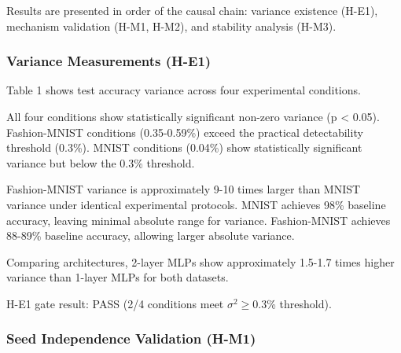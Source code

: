 
Results are presented in order of the causal chain: variance existence (H-E1), mechanism validation (H-M1, H-M2), and stability analysis (H-M3).

\subsubsection{Variance Measurements (H-E1)}

Table 1 shows test accuracy variance across four experimental conditions.

\begin{table}[htbp]
\centering
{}
\end{table}

All four conditions show statistically significant non-zero variance (p < 0.05). Fashion-MNIST conditions (0.35-0.59\%) exceed the practical detectability threshold (0.3\%). MNIST conditions (0.04\%) show statistically significant variance but below the 0.3\% threshold.

Fashion-MNIST variance is approximately 9-10 times larger than MNIST variance under identical experimental protocols. MNIST achieves 98\% baseline accuracy, leaving minimal absolute range for variance. Fashion-MNIST achieves 88-89\% baseline accuracy, allowing larger absolute variance.

Comparing architectures, 2-layer MLPs show approximately 1.5-1.7 times higher variance than 1-layer MLPs for both datasets.

H-E1 gate result: PASS (2/4 conditions meet $\sigma ^{2}\geq 0.3$\% threshold).

\subsubsection{Seed Independence Validation (H-M1)}


